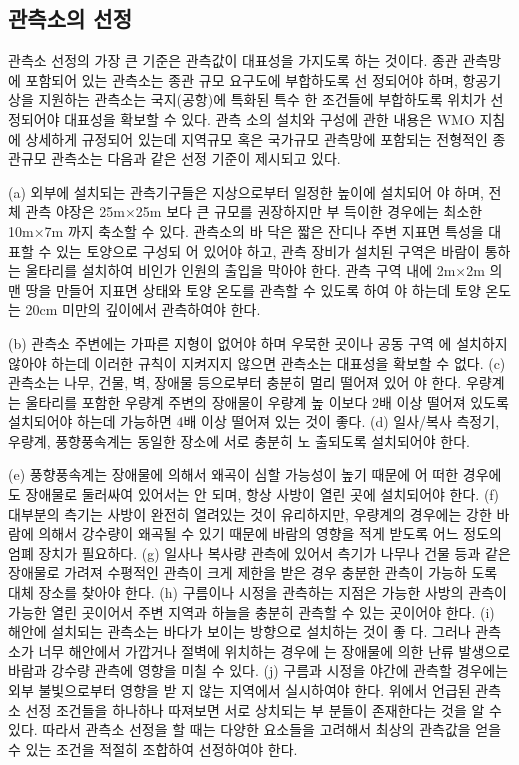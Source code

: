 \begin{itemize}
\subsection{관측소의 선정}
관측소 선정의 가장 큰 기준은 관측값이 대표성을 가지도록 하는 것이다.
종관 관측망에 포함되어 있는 관측소는 종관 규모 요구도에 부합하도록 선
정되어야 하며, 항공기상을 지원하는 관측소는 국지(공항)에 특화된 특수
한 조건들에 부합하도록 위치가 선정되어야 대표성을 확보할 수 있다. 관측
소의 설치와 구성에 관한 내용은 WMO 지침에 상세하게 규정되어 있는데
지역규모 혹은 국가규모 관측망에 포함되는 전형적인 종관규모 관측소는
다음과 같은 선정 기준이 제시되고 있다.

(a) 외부에 설치되는 관측기구들은 지상으로부터 일정한 높이에 설치되어
야 하며, 전체 관측 야장은 25m×25m 보다 큰 규모를 권장하지만 부
득이한 경우에는 최소한 10m×7m 까지 축소할 수 있다. 관측소의 바
닥은 짧은 잔디나 주변 지표면 특성을 대표할 수 있는 토양으로 구성되
어 있어야 하고, 관측 장비가 설치된 구역은 바람이 통하는 울타리를
설치하여 비인가 인원의 출입을 막아야 한다. 관측 구역 내에 2m×2m
의 맨 땅을 만들어 지표면 상태와 토양 온도를 관측할 수 있도록 하여
야 하는데 토양 온도는 20cm 미만의 깊이에서 관측하여야 한다.

(b) 관측소 주변에는 가파른 지형이 없어야 하며 우묵한 곳이나 공동 구역
에 설치하지 않아야 하는데 이러한 규칙이 지켜지지 않으면 관측소는
대표성을 확보할 수 없다.
(c) 관측소는 나무, 건물, 벽, 장애물 등으로부터 충분히 멀리 떨어져 있어
야 한다. 우량계는 울타리를 포함한 우량계 주변의 장애물이 우량계 높
이보다 2배 이상 떨어져 있도록 설치되어야 하는데 가능하면 4배 이상
떨어져 있는 것이 좋다.
(d) 일사/복사 측정기, 우량계, 풍향풍속계는 동일한 장소에 서로 충분히 노
출되도록 설치되어야 한다.

(e) 풍향풍속계는 장애물에 의해서 왜곡이 심할 가능성이 높기 때문에 어
떠한 경우에도 장애물로 둘러싸여 있어서는 안 되며, 항상 사방이 열린
곳에 설치되어야 한다.
(f) 대부분의 측기는 사방이 완전히 열려있는 것이 유리하지만, 우량계의
경우에는 강한 바람에 의해서 강수량이 왜곡될 수 있기 때문에 바람의
영향을 적게 받도록 어느 정도의 엄폐 장치가 필요하다.
(g) 일사나 복사량 관측에 있어서 측기가 나무나 건물 등과 같은 장애물로
가려져 수평적인 관측이 크게 제한을 받은 경우 충분한 관측이 가능하
도록 대체 장소를 찾아야 한다.
(h) 구름이나 시정을 관측하는 지점은 가능한 사방의 관측이 가능한 열린
곳이어서 주변 지역과 하늘을 충분히 관측할 수 있는 곳이어야 한다.
(i) 해안에 설치되는 관측소는 바다가 보이는 방향으로 설치하는 것이 좋
다. 그러나 관측소가 너무 해안에서 가깝거나 절벽에 위치하는 경우에
는 장애물에 의한 난류 발생으로 바람과 강수량 관측에 영향을 미칠 수
있다.
(j) 구름과 시정을 야간에 관측할 경우에는 외부 불빛으로부터 영향을 받
지 않는 지역에서 실시하여야 한다.
위에서 언급된 관측소 선정 조건들을 하나하나 따져보면 서로 상치되는 부
분들이 존재한다는 것을 알 수 있다. 따라서 관측소 선정을 할 때는 다양한
요소들을 고려해서 최상의 관측값을 얻을 수 있는 조건을 적절히 조합하여
선정하여야 한다.


\end{itemize}
